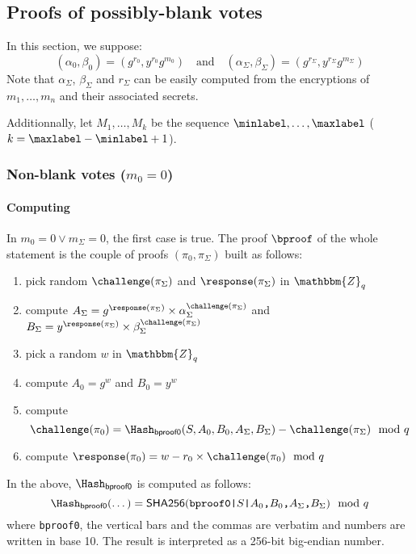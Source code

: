\documentclass[a4paper]{article}
\newcommand{\Z}{\mathbbm{Z}}
\newcommand{\shatwo}{\textsf{SHA256}}
\begin{document}
\subsection{Proofs of possibly-blank votes}
\label{bproof}

In this section, we suppose:
\[
(\alpha_0,\beta_0)=(g^{r_0},y^{r_0}g^{m_0})
\quad\text{and}\quad
(\alpha_\Sigma,\beta_\Sigma)=(g^{r_\Sigma},y^{r_\Sigma}g^{m_\Sigma})
\]
Note that $\alpha_\Sigma$, $\beta_\Sigma$ and $r_\Sigma$ can be easily
computed from the encryptions of $m_1,\dotsc,m_n$ and their associated
secrets.

Additionnally, let $M_1,\dotsc,M_k$ be the sequence
$\minlabel,\dots,\maxlabel$ ($k=\maxlabel-\minlabel+1$).

\subsubsection{Non-blank votes ($m_0=0$)}
\label{non-blank-votes}

\paragraph{Computing \bproof}
In $m_0=0\lor m_\Sigma=0$, the first case is true. The proof $\bproof$
of the whole statement is the couple of proofs $(\pi_0,\pi_\Sigma)$
built as follows:
\begin{enumerate}
\item pick random $\challenge(\pi_\Sigma)$ and $\response(\pi_\Sigma)$
  in $\Z_q$
\item compute
  $A_\Sigma=g^{\response(\pi_\Sigma)}\times\alpha_\Sigma^{\challenge(\pi_\Sigma)}$
  and
  $B_\Sigma=y^{\response(\pi_\Sigma)}\times\beta_\Sigma^{\challenge(\pi_\Sigma)}$
\item pick a random $w$ in $\Z_q$
\item compute $A_0=g^w$ and $B_0=y^w$
\item compute \[\challenge(\pi_0)=\Hash_{\mathsf{bproof0}}(S,A_0,B_0,A_\Sigma,B_\Sigma)-\challenge(\pi_\Sigma)\mod q\]
\item compute $\response(\pi_0)=w-r_0\times\challenge(\pi_0)\mod q$
\end{enumerate}
In the above, $\Hash_{\mathsf{bproof0}}$ is computed as follows:
\[\Hash_{\mathsf{bproof0}}(\dotsc)=
\shatwo(\verb=bproof0|=S\verb=|=A_0\verb=,=B_0\verb=,=A_\Sigma\verb=,=B_\Sigma)\mod q\]
where \verb=bproof0=, the vertical bars and the commas are verbatim and
numbers are written in base 10. The result is interpreted as a 256-bit
big-endian number.
\end{document}

